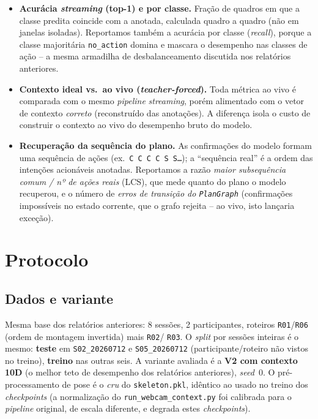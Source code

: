 \documentclass[11pt]{article}
\begin{document}
\begin{itemize}
  \item \textbf{Acurácia \emph{streaming} (top-1) e por classe.} Fração de
    quadros em que a classe predita coincide com a anotada, calculada quadro a
    quadro (não em janelas isoladas). Reportamos também a acurácia por classe
    (\emph{recall}), porque a classe majoritária \texttt{no\_action} domina e
    mascara o desempenho nas classes de ação -- a mesma armadilha de
    desbalanceamento discutida nos relatórios anteriores.
  \item \textbf{Contexto ideal vs.\ ao vivo (\emph{teacher-forced}).} Toda
    métrica ao vivo é comparada com o mesmo \emph{pipeline} \emph{streaming},
    porém alimentado com o vetor de contexto \emph{correto} (reconstruído das
    anotações). A diferença isola o custo de construir o contexto ao vivo do
    desempenho bruto do modelo.
  \item \textbf{Recuperação da sequência do plano.} As confirmações do modelo
    formam uma sequência de ações (ex.\ \texttt{C\,C\,C\,C\,S\,S\dots}); a
    ``sequência real'' é a ordem das intenções acionáveis anotadas.
    Reportamos a razão \emph{maior subsequência comum / nº de ações reais}
    (LCS), que mede quanto do plano o modelo recuperou, e o número de
    \emph{erros de transição do \texttt{PlanGraph}} (confirmações impossíveis no
    estado corrente, que o grafo rejeita -- ao vivo, isto lançaria exceção).
\end{itemize}

\section{Protocolo}
\label{sec:protocolo}

\subsection{Dados e variante}
\label{sec:dados}

Mesma base dos relatórios anteriores: 8 sessões, 2 participantes, roteiros
\texttt{R01}/\texttt{R06} (ordem de montagem invertida) mais \texttt{R02}/%
\texttt{R03}. O \emph{split} por sessões inteiras é o mesmo: \textbf{teste} em
\texttt{S02\_20260712} e \texttt{S05\_20260712} (participante/roteiro não vistos
no treino), \textbf{treino} nas outras seis. A variante avaliada é a
\textbf{V2 com contexto 10D} (o melhor teto de desempenho dos relatórios
anteriores), \emph{seed}~0. O pré-processamento de pose é o \emph{cru} do
\texttt{skeleton.pkl}, idêntico ao usado no treino dos \emph{checkpoints}
(a normalização do \texttt{run\_webcam\_context.py} foi calibrada para o
\emph{pipeline} original, de escala diferente, e degrada estes \emph{checkpoints}).
\end{document}
